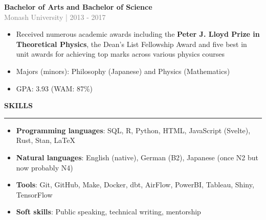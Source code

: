 \documentclass[10pt]{article}
\begin{document}
\vspace{0.5cm}
{\bf Bachelor of Arts and Bachelor of Science} \\
\textcolor{gray}{Monash University | 2013 - 2017} 
\begin{small}
\begin{itemize}
\item Received numerous academic awards including the \textbf{Peter J. Lloyd Prize in Theoretical Physics}, 
the Dean's List Fellowship Award and five best in unit awards for achieving top marks across various physics courses
\item Majors (minors): Philosophy (Japanese) and Physics (Mathematics)
\item GPA: 3.93 (WAM: 87\%)
\end{itemize}
\end{small}

\vspace{1cm}
\begin{large}
{\bf SKILLS} \\
\textcolor{gray}{\rule{2cm}{2mm}}
\end{large}
\begin{small}
\begin{itemize}
\item \textbf{Programming languages}: SQL, R, Python, HTML, JavaScript (Svelte), Rust, Stan, LaTeX
\item \textbf{Natural languages}: English (native), German (B2), Japanese (once N2 but now probably N4)
\item \textbf{Tools}: Git, GitHub, Make, Docker, dbt, AirFlow, PowerBI, Tableau, Shiny, TensorFlow
\item \textbf{Soft skills}: Public speaking, technical writing, mentorship
\end{itemize}
\end{small}
\end{document}
